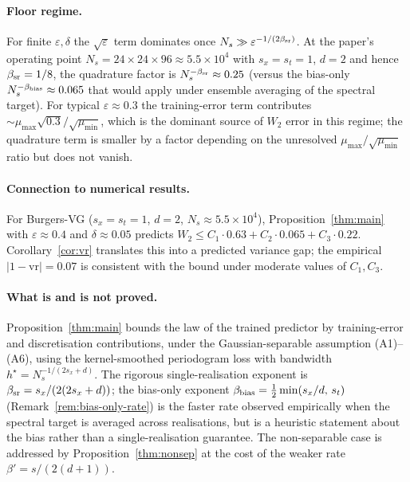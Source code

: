 \documentclass[review,12pt]{elsarticle}
\begin{document}
\paragraph{Floor regime.}
For finite \(\varepsilon, \delta\) the \(\sqrt\varepsilon\) term
dominates once \(N_s \gg \varepsilon^{-1/(2\beta_{\rm sr})}\). At the
paper's operating point
\(N_s = 24 \times 24 \times 96 \approx 5.5 \times 10^4\) with
\(s_x = s_t = 1\), \(d = 2\) and hence \(\beta_{\rm sr} = 1/8\), the
quadrature factor is \(N_s^{-\beta_{\rm sr}} \approx 0.25\) (versus the
bias-only $N_s^{-\beta_{\rm bias}} \approx 0.065$ that would apply
under ensemble averaging of the spectral target). For typical
\(\varepsilon \approx 0.3\) the training-error term contributes
\(\sim \mu_{\max}\sqrt{0.3}/\sqrt{\mu_{\min}}\), which is the
dominant source of \(W_2\) error in this regime; the quadrature
term is smaller by a factor depending on the unresolved
\(\mu_{\max}/\sqrt{\mu_{\min}}\) ratio but does not vanish.

\paragraph{Connection to numerical results.}
For Burgers-VG (\(s_x = s_t = 1\), \(d = 2\),
\(N_s \approx 5.5 \times 10^4\)),
Proposition~\ref{thm:main} with \(\varepsilon \approx 0.4\) and
\(\delta \approx 0.05\) predicts
\(W_2 \le C_1 \cdot 0.63 + C_2 \cdot 0.065 + C_3 \cdot 0.22\).
Corollary~\ref{cor:vr} translates this into a predicted variance gap;
the empirical \(|1 - \mathrm{vr}| = 0.07\) is consistent with the
bound under moderate values of \(C_1, C_3\).

\paragraph{What is and is not proved.}
Proposition~\ref{thm:main} bounds the law of the trained predictor
by training-error and discretisation contributions, under the
Gaussian-separable assumption (A1)--(A6), using the
kernel-smoothed periodogram loss with bandwidth
$h^\star = N_s^{-1/(2s_x+d)}$. The rigorous single-realisation
exponent is $\beta_{\rm sr} = s_x/(2(2s_x+d))$; the bias-only
exponent $\beta_{\rm bias} = \tfrac12\min(s_x/d,\,s_t)$
(Remark~\ref{rem:bias-only-rate})
is the faster rate observed empirically when the spectral target
is averaged across realisations, but is a heuristic statement
about the bias rather than a single-realisation guarantee. The
non-separable case is addressed by Proposition~\ref{thm:nonsep}
at the cost of the weaker rate $\beta' = s/(2(d+1))$.
\end{document}
